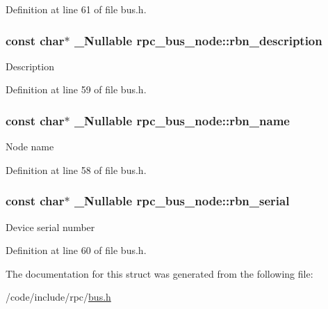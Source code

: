 Definition at line 61 of file bus.\+h.

\subsubsection[{\texorpdfstring{rbn\+\_\+description}{rbn_description}}]{\setlength{\rightskip}{0pt plus 5cm}const char$\ast$ \+\_\+\+Nullable rpc\+\_\+bus\+\_\+node\+::rbn\+\_\+description}\hypertarget{structrpc__bus__node_af5d23beee7c50520e7235f0c922fafb1}{}\label{structrpc__bus__node_af5d23beee7c50520e7235f0c922fafb1}
Description 

Definition at line 59 of file bus.\+h.

\subsubsection[{\texorpdfstring{rbn\+\_\+name}{rbn_name}}]{\setlength{\rightskip}{0pt plus 5cm}const char$\ast$ \+\_\+\+Nullable rpc\+\_\+bus\+\_\+node\+::rbn\+\_\+name}\hypertarget{structrpc__bus__node_a9afbf9a155ae01c1c47dc210a8334022}{}\label{structrpc__bus__node_a9afbf9a155ae01c1c47dc210a8334022}
Node name 

Definition at line 58 of file bus.\+h.

\subsubsection[{\texorpdfstring{rbn\+\_\+serial}{rbn_serial}}]{\setlength{\rightskip}{0pt plus 5cm}const char$\ast$ \+\_\+\+Nullable rpc\+\_\+bus\+\_\+node\+::rbn\+\_\+serial}\hypertarget{structrpc__bus__node_a885b358a61a0b459d86d7c534be6ef0f}{}\label{structrpc__bus__node_a885b358a61a0b459d86d7c534be6ef0f}
Device serial number 

Definition at line 60 of file bus.\+h.



The documentation for this struct was generated from the following file\+:\begin{DoxyCompactItemize}
\item 
/code/include/rpc/\hyperlink{bus_8h}{bus.\+h}\end{DoxyCompactItemize}
